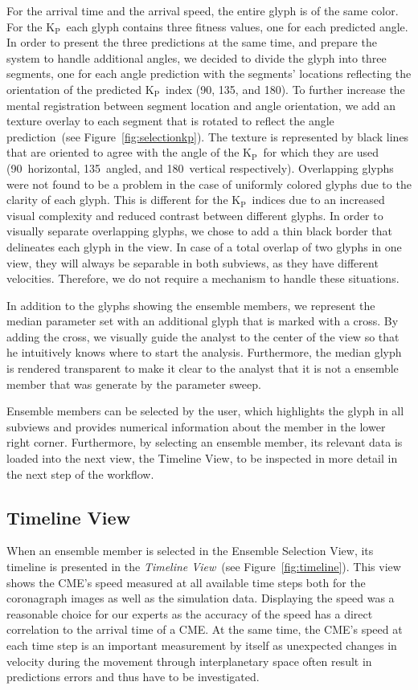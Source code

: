 \documentclass[journal]{vgtc}                %
\newcommand{\kpIndex}{$\textrm{K}_\textrm{P}$}
\begin{document}
For the arrival time and the arrival speed, the entire glyph is of the same color. For the \kpIndex\ each glyph contains three fitness values, one for each predicted angle. In order to present the three predictions at the same time, and prepare the system to handle additional angles, we decided to divide the glyph into three segments, one for each angle prediction with the segments' locations reflecting the orientation of the predicted \kpIndex\ index (90\degree , 135\degree , and 180\degree ). To further increase the mental registration between segment location and angle orientation, we add an texture overlay to each segment that is rotated to reflect the angle prediction~(see Figure~\ref{fig:selectionkp}). The texture is represented by black lines that are oriented to agree with the angle of the \kpIndex\ for which they are used (90\degree\ horizontal, 135\degree\ angled, and 180\degree\ vertical respectively). Overlapping glyphs were not found to be a problem in the case of uniformly colored glyphs due to the clarity of each glyph. This is different for the \kpIndex\ indices due to an increased visual complexity and reduced contrast between different glyphs. In order to visually separate overlapping glyphs, we chose to add a thin black border that delineates each glyph in the view. In case of a total overlap of two glyphs in one view, they will always be separable in both subviews, as they have different velocities. Therefore, we do not require a mechanism to handle these situations.

In addition to the glyphs showing the ensemble members, we represent the median parameter set with an additional glyph that is marked with a cross. By adding the cross, we visually guide the analyst to the center of the view so that he intuitively knows where to start the analysis. Furthermore, the median glyph is rendered transparent to make it clear to the analyst that it is not a ensemble member that was generate by the parameter sweep.

Ensemble members can be selected by the user, which highlights the glyph in all subviews and provides numerical information about the member in the lower right corner. Furthermore, by selecting an ensemble member, its relevant data is loaded into the next view, the Timeline View, to be inspected in more detail in the next step of the workflow.

\subsection{Timeline View} \label{sec:timeline}
When an ensemble member is selected in the Ensemble Selection View, its timeline is presented in the \emph{Timeline View}~(see Figure~\ref{fig:timeline}). This view shows the CME's speed measured at all available time steps both for the coronagraph images as well as the simulation data. Displaying the speed was a reasonable choice for our experts as the accuracy of the speed has a direct correlation to the arrival time of a CME. At the same time, the CME's speed at each time step is an important measurement by itself as unexpected changes in velocity during the movement through interplanetary space often result in predictions errors and thus have to be investigated.
\end{document}
